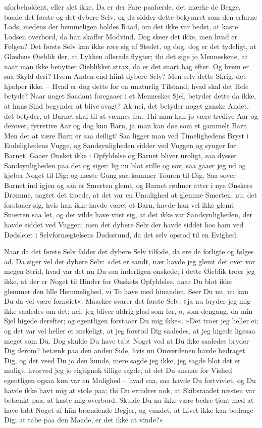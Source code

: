 \documentclass[12pt,a4paper]{article}
\begin{document}
uforbeholdent, eller slet ikke. Da er der Fare paafærde, det mærke de Begge, baade det første og det dybere Selv, og da sidder dette bekymret som den erfarne Lods, medens der hemmeligen holdes Raad, om det ikke var bedst, at kaste Lodsen overbord, da han skaffer Modvind. Dog skeer det ikke, men hvad er Følgen? Det første Selv kan ikke røre sig af Stedet, og dog, dog er det tydeligt, at Glædens Øieblik iler, at Lykken allerede flygter; thi det sige jo Menneskene, at naar man ikke benytter Øieblikket strax, da er det snart bag efter. Og hvem er saa Skyld deri? Hvem Anden end hiint dybere Selv? Men selv dette Skrig, det hjælper ikke. – Hvad er dog dette for en unaturlig Tilstand; hvad skal det Hele betyde? Naar noget Saadant foregaaer i et Menneskes Sjel, betyder dette da ikke, at hans Sind begynder at blive svagt? Ak nei, det betyder noget ganske Andet, det betyder, at Barnet skal til at vænnes fra. Thi man kan jo være tredive Aar og derover, fyrretive Aar og dog kun Barn, ja man kan døe som et gammelt Barn. Men det at være Barn er saa deiligt! Saa ligger man ved Timelighedens Bryst i Endelighedens Vugge, og Sandsynligheden sidder ved Vuggen og synger for Barnet. Gaaer Ønsket ikke i Opfyldelse og Barnet bliver uroligt, saa dysser Sandsynligheden paa det og siger: lig nu blot stille og sov, saa gaaer jeg ud og kjøber Noget til Dig; og næste Gang saa kommer Touren til Dig. Saa sover Barnet ind igjen og saa er Smerten glemt, og Barnet rødmer atter i nye Ønskers Drømme, uagtet det troede, at det var en Umulighed at glemme Smerten; nu, det forstaaer sig, hvis han ikke havde været et Barn, havde han vel ikke glemt Smerten saa let, og det vilde have viist sig, at det ikke var Sandsynligheden, der havde siddet ved Vuggen; men det dybere Selv der havde siddet hos ham ved Dødsleiet i Selvfornægtelsens Dødsstund, da det selv opstod til en Evighed.

Naar da det første Selv falder det dybere Selv tilfode, da ere de forligte og følges ad. Da siger vel det dybere Selv: »det er sandt, nær havde jeg glemt det over vor megen Strid, hvad var det nu Du saa inderligen ønskede; i dette Øieblik troer jeg ikke, at der er Noget til Hinder for Ønskets Opfyldelse, naar Du blot ikke glemmer den lille Hemmelighed, vi To have med hinanden. Seer Du nu, nu kan Du da vel være fornøiet«. Maaskee svarer det første Selv: »ja nu bryder jeg mig ikke saaledes om det; nei, jeg bliver aldrig glad som før, o, som dengang, da min Sjel higede derefter; og egentligen forstaaer Du mig ikke«. »Det troer jeg heller ei; og det var vel heller ei ønskeligt, at jeg forstod Dig saaledes, at jeg higede ligesaa meget som Du. Dog skulde Du have tabt Noget ved at Du ikke saaledes bryder Dig derom? betænk paa den anden Side, hvis nu Omverdenen havde bedraget Dig, og det veed Du jo den kunde, mere sagde jeg ikke, jeg sagde blot det er muligt, hvorved jeg jo rigtignok tillige sagde, at det Du ansaae for Vished egentligen ogsaa kun var en Mulighed – hvad saa, saa havde Du fortvivlet, og Du havde ikke havt mig at stole paa; thi Du erindrer nok, at Skibsraadet næsten var betænkt paa, at kaste mig overbord. Skulde Du nu ikke være bedre tjent med at have tabt Noget af hiin brændende Begjer, og vundet, at Livet ikke kan bedrage Dig; at tabe paa den Maade, er det ikke at vinde?«
\end{document}
